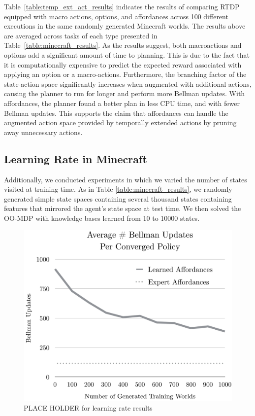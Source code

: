 \documentclass[conference]{IEEEtran}
\newcommand{\dnote}[1]{\textcolor{Green}{\textbf{}}}
\begin{document}
Table~\ref{table:temp_ext_act_results} indicates the results of comparing RTDP
equipped with macro actions, options, and affordances across 100 different executions
in the same randomly generated Minecraft worlds. The results above are averaged across tasks of
each type presented in Table~\ref{table:minecraft_results}. As the results 
suggest, both macroactions and options add a significant amount of time to planning.
This is due to the fact that it is computationally expensive to predict the expected reward
associated with applying an option or a macro-actions. Furthermore, the branching factor of the
state-action space significantly increases when augmented with additional actions, causing the
planner to run for longer and perform more Bellman updates. With affordances, the planner found a better plan
in less CPU time, and with fewer Bellman updates. This supports the claim that affordances can handle the augmented 
action space provided by temporally extended actions by pruning away unnecessary actions.

\subsection{Learning Rate in Minecraft}
Additionally, we conducted experiments in which we varied the number of states visited at training time. 
As in Table \ref{table:minecraft_results}, we randomly generated simple state spaces
containing several thousand states containing features that mirrored the agent's state
space at test time. We then solved the OO-MDP with knowledge bases learned from 
10 to 10000 states.\dnote{update when training complete}

\dnote{Experiments have not yet finished for learning rate (underway)}

\begin{figure}[H]
\centering
\includegraphics[scale=0.195]{figures/training_results.png}%
  \caption{PLACE HOLDER for learning rate results}
  \label{fig:training_results}
\end{figure}
\end{document}
